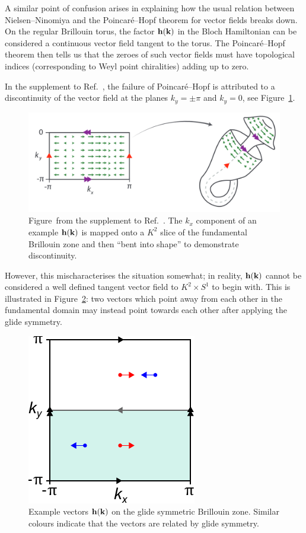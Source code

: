 A similar point of confusion arises in explaining how the usual relation between Nielsen--Ninomiya and the Poincaré--Hopf theorem for vector fields breaks down. On the regular Brillouin torus, the factor $\vb{h}(\vb{k})$ in the Bloch Hamiltonian can be considered a continuous vector field tangent to the torus. The Poincaré--Hopf theorem then tells us that the zeroes of such vector fields must have topological indices (corresponding to Weyl point chiralities) adding up to zero.

In the supplement to Ref.~\cite{Fonseca-Vaidya_nonorientable}, the failure of Poincaré--Hopf is attributed to a discontinuity of the vector field at the planes $k_y=\pm\pi$ and $k_y=0$, see Figure~\ref{fig:Klein-discontinuity}.
\begin{figure}[htb!]
	\centering
	\includegraphics[width=.8\linewidth]{Images/Klein-discontinuity}
	\caption{Figure~from the supplement to Ref.~\cite{Fonseca-Vaidya_nonorientable}. The $k_x$ component of an example $\vb{h}(\vb{k})$ is mapped onto a $K^2$ slice of the fundamental Brillouin zone and then ``bent into shape'' to demonstrate discontinuity.
	}
	\label{fig:Klein-discontinuity}
\end{figure}
However, this mischaracterises the situation somewhat; in reality, $\vb{h}(\vb{k})$ cannot be considered a well defined tangent vector field to $K^2\times S^1$ to begin with. This is illustrated in Figure~\ref{fig:BZ_vectors}: two vectors which point away from each other in the fundamental domain may instead point towards each other after applying the glide symmetry.
\begin{figure}[htb!]
	\centering
	\includegraphics[width=.3\linewidth]{Images/BZ_vectors}
	\caption{Example vectors $\vb{h}(\vb{k})$ on the glide symmetric Brillouin zone. Similar colours indicate that the vectors are related by glide symmetry.}
	\label{fig:BZ_vectors}
\end{figure}
